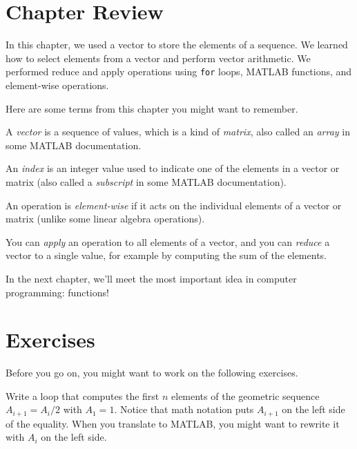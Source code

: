 \section{Chapter Review}

In this chapter, we used a vector to store the elements of a sequence.  We learned how to select elements from a vector and perform vector arithmetic.  We performed reduce and apply operations using \lstinline{for} loops, MATLAB functions, and element-wise operations.

Here are some terms from this chapter you might want to remember.


A \emph{vector} is a sequence of values, which is a kind of \emph{matrix}, also called an \emph{array} in some MATLAB documentation.

An \emph{index} is an integer value used to indicate one of the elements
in a vector or matrix (also called a \emph{subscript} in some MATLAB documentation).

An operation is \emph{element-wise} if it acts on the individual elements of a vector or matrix (unlike some linear algebra operations).

You can \emph{apply} an operation to all elements of a vector, and you can \mbox{\emph{reduce}} a vector to a single value, for example by computing the sum of the elements.


In the next chapter, we'll meet the most important idea in computer programming: functions!



\section{Exercises}

Before you go on, you might want to work on the following exercises.

\begin{ex}
Write a loop that computes the first $n$ elements
of the geometric sequence $A_{i+1} = A_i/2$ with $A_1 = 1$.  Notice that
math notation puts $A_{i+1}$ on the left side of the equality.
When you translate to MATLAB, you might want to rewrite it with
$A_{i}$ on the left side.
\end{ex}



